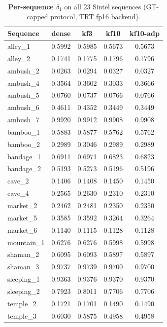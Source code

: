 
\begin{table}[t]
\centering\footnotesize
\setlength{\tabcolsep}{3pt}
\caption{\textbf{Per-sequence $\delta_1$} on all 23 Sintel sequences
(GT-capped protocol, TRT fp16 backend).}
\label{tab:perseqfull}
\begin{tabular}{lcccc}
\toprule
Sequence & dense & kf3 & kf10 & kf10-adp\\
\midrule
alley\_1 & 0.5992 & 0.5985 & 0.5673 & 0.5673 \\
alley\_2 & 0.1741 & 0.1775 & 0.1796 & 0.1796 \\
ambush\_2 & 0.0263 & 0.0294 & 0.0327 & 0.0327 \\
ambush\_4 & 0.3564 & 0.3602 & 0.3033 & 0.3666 \\
ambush\_5 & 0.0760 & 0.0737 & 0.0766 & 0.0766 \\
ambush\_6 & 0.4611 & 0.4352 & 0.3449 & 0.3449 \\
ambush\_7 & 0.9920 & 0.9912 & 0.9908 & 0.9908 \\
bamboo\_1 & 0.5883 & 0.5877 & 0.5762 & 0.5762 \\
bamboo\_2 & 0.2989 & 0.3046 & 0.2989 & 0.2989 \\
bandage\_1 & 0.6911 & 0.6971 & 0.6823 & 0.6823 \\
bandage\_2 & 0.5193 & 0.5273 & 0.5196 & 0.5196 \\
cave\_2 & 0.1406 & 0.1408 & 0.1450 & 0.1450 \\
cave\_4 & 0.2565 & 0.2630 & 0.2310 & 0.2310 \\
market\_2 & 0.2462 & 0.2481 & 0.2350 & 0.2350 \\
market\_5 & 0.3585 & 0.3592 & 0.3264 & 0.3264 \\
market\_6 & 0.1140 & 0.1115 & 0.1128 & 0.1128 \\
mountain\_1 & 0.6276 & 0.6276 & 0.5998 & 0.5998 \\
shaman\_2 & 0.6095 & 0.6093 & 0.5897 & 0.5897 \\
shaman\_3 & 0.9737 & 0.9739 & 0.9700 & 0.9700 \\
sleeping\_1 & 0.9363 & 0.9376 & 0.9370 & 0.9370 \\
sleeping\_2 & 0.7923 & 0.8011 & 0.7706 & 0.7706 \\
temple\_2 & 0.1721 & 0.1701 & 0.1490 & 0.1490 \\
temple\_3 & 0.6030 & 0.5875 & 0.4958 & 0.4958 \\
\bottomrule
\end{tabular}
\end{table}
